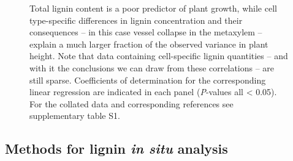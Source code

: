 \documentclass[journal=,manuscript=]{achemso}
\begin{document}
\label{cell-fig-correlation}
\begin{figure}[H]


\caption{\label{fig-correlation}Total lignin content is a poor predictor
of plant growth, while cell type-specific differences in lignin
concentration and their consequences -- in this case vessel collapse in
the metaxylem -- explain a much larger fraction of the observed variance
in plant height. Note that data containing cell-specific lignin
quantities -- and with it the conclusions we can draw from these
correlations -- are still sparse. Coefficients of determination for the
corresponding linear regression are indicated in each panel
(\emph{P}-values all \textless{} 0.05). For the collated data and
corresponding references see supplementary table S1.}

\end{figure}%

\subsection{\texorpdfstring{Methods for lignin \emph{in situ}
analysis}{Methods for lignin in situ analysis}}\label{methods-for-lignin-in-situ-analysis}
\end{document}

